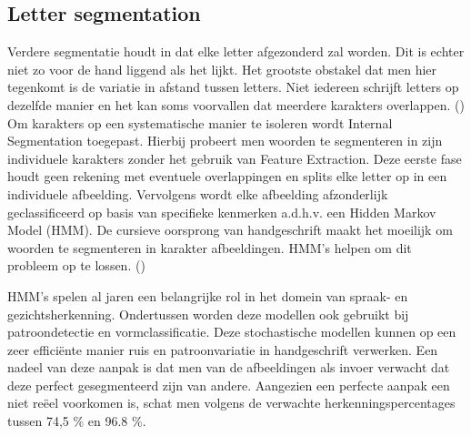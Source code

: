 \subsection{Letter segmentation}
Verdere segmentatie houdt in dat elke letter afgezonderd zal worden. Dit is echter niet zo voor de hand liggend als het lijkt. Het grootste obstakel dat men hier tegenkomt is de variatie in afstand tussen letters. Niet iedereen schrijft letters op dezelfde manier en het kan soms voorvallen dat meerdere karakters overlappen. (\cite{VijayLaxmiSahu2012}) \newline Om karakters op een systematische manier te isoleren wordt Internal Segmentation toegepast. Hierbij probeert men woorden te segmenteren in zijn individuele karakters zonder het gebruik van Feature Extraction. Deze eerste fase houdt geen rekening met eventuele overlappingen en splits elke letter op in een individuele afbeelding. Vervolgens wordt elke afbeelding afzonderlijk geclassificeerd op basis van specifieke kenmerken a.d.h.v. een Hidden Markov Model (HMM).
De cursieve oorsprong van handgeschrift maakt het moeilijk om woorden te segmenteren in karakter afbeeldingen. HMM's helpen om dit probleem op te lossen. 
 (\cite{NafizArica2001}) \newline

HMM’s spelen al jaren een belangrijke rol in het domein van spraak- en gezichtsherkenning. Ondertussen worden deze modellen ook gebruikt bij patroondetectie en vormclassificatie. Deze stochastische modellen kunnen op een zeer efficiënte manier ruis en patroonvariatie in handgeschrift verwerken. Een nadeel van deze aanpak is dat men van de afbeeldingen als invoer verwacht dat deze perfect gesegmenteerd zijn van andere. Aangezien een perfecte aanpak een niet reëel voorkomen is, schat men volgens \cite{Bunke1995} de verwachte herkenningspercentages tussen 74,5 \% en 96.8 \%. 
